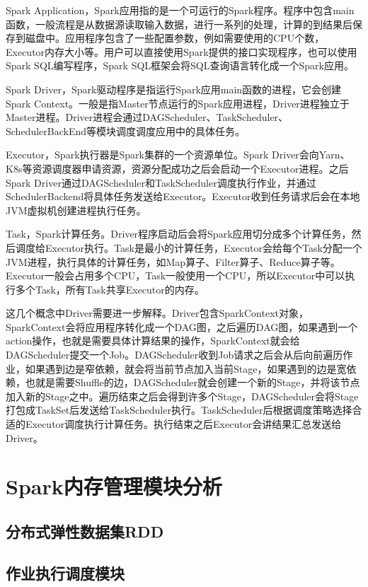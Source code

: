 Spark Application，Spark应用指的是一个可运行的Spark程序。程序中包含main函数，一般流程是从数据源读取输入数据，进行一系列的处理，计算的到结果后保存到磁盘中。应用程序包含了一些配置参数，例如需要使用的CPU个数，Executor内存大小等。用户可以直接使用Spark提供的接口实现程序，也可以使用Spark SQL编写程序，Spark SQL框架会将SQL查询语言转化成一个Spark应用。

Spark Driver，Spark驱动程序是指运行Spark应用main函数的进程，它会创建Spark Context。一般是指Master节点运行的Spark应用进程，Driver进程独立于Master进程。Driver进程会通过DAGScheduler、TaskScheduler、SchedulerBackEnd等模块调度调度应用中的具体任务。

Executor，Spark执行器是Spark集群的一个资源单位。Spark Driver会向Yarn、K8s等资源调度器申请资源，资源分配成功之后会启动一个Executor进程。之后Spark Driver通过DAGScheduler和TaskScheduler调度执行作业，并通过SchedulerBackend将具体任务发送给Executor。Executor收到任务请求后会在本地JVM虚拟机创建进程执行任务。

Task，Spark计算任务。Driver程序启动后会将Spark应用切分成多个计算任务，然后调度给Executor执行。Task是最小的计算任务，Executor会给每个Task分配一个JVM进程，执行具体的计算任务，如Map算子、Filter算子、Reduce算子等。Executor一般会占用多个CPU，Task一般使用一个CPU，所以Executor中可以执行多个Task，所有Task共享Executor的内存。

这几个概念中Driver需要进一步解释。Driver包含SparkContext对象，SparkContext会将应用程序转化成一个DAG图，之后遍历DAG图，如果遇到一个action操作，也就是需要具体计算结果的操作，SparkContext就会给DAGScheduler提交一个Job。DAGScheduler收到Job请求之后会从后向前遍历作业，如果遇到边是窄依赖，就会将当前节点加入当前Stage，如果遇到的边是宽依赖，也就是需要Shuffle的边，DAGScheduler就会创建一个新的Stage，并将该节点加入新的Stage之中。遍历结束之后会得到许多个Stage，DAGScheduler会将Stage打包成TaskSet后发送给TaskScheduler执行。TaskScheduler后根据调度策略选择合适的Executor调度执行计算任务。执行结束之后Executor会讲结果汇总发送给Driver。


\section{Spark内存管理模块分析}



\subsection{分布式弹性数据集RDD}
\subsection{作业执行调度模块}
